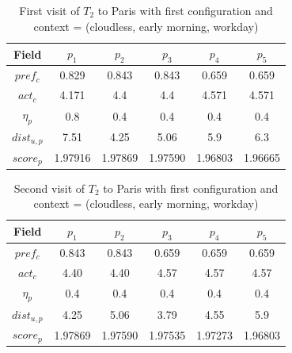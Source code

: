 \begin{table}[h!]
\vspace{-0.1cm}
\footnotesize{
    \centering
        \caption{First visit of $T_2$ to Paris with first configuration and context = (cloudless, early morning, workday)}
    \label{table:t2-3}
    \vspace{-0.3cm}
    \begin{tabular}{ |c|c|c|c|c|c| } 
        \hline
        Field   & $p_1$ & $p_2$ & $p_3$ & $p_4$ & $p_5$ \\
        \hline
        $pref_c$    &  0.829 & 0.843 & 0.843 & 0.659 & 0.659 \\
        $act_c$     & 4.171 & 4.4 & 4.4 & 4.571 & 4.571 \\
        $\eta_p$    & 0.8 & 0.4 & 0.4 & 0.4 & 0.4 \\
        $dist_{u,p}$ & 7.51 & 4.25 & 5.06 & 5.9 & 6.3 \\
        $score_p$    & 1.97916 & 1.97869 & 1.97590 & 1.96803 & 1.96665 \\
        
        \hline
    \end{tabular}
    }
    \vspace{-0.1cm}
\end{table}

\begin{table}[h!]
\vspace{-0.1cm}
\footnotesize{
    \centering
        \caption{Second visit of $T_2$ to Paris with first configuration and context = (cloudless,  early morning, workday)}
    \label{table:t2-4}
    \vspace{-0.3cm}
    \begin{tabular}{ |c|c|c|c|c|c| } 
        \hline
        Field   & $p_1$ & $p_2$ & $p_3$ & $p_4$ & $p_5$ \\
        \hline
        $pref_c$    &  0.843 & 0.843 & 0.659 & 0.659 & 0.659 \\
        $act_c$     & 4.40 & 4.40 & 4.57 & 4.57 & 4.57  \\
        $\eta_p$    & 0.4 & 0.4 & 0.4 & 0.4 & 0.4 \\
        $dist_{u,p}$ & 4.25 & 5.06 & 3.79 & 4.55 & 5.9 \\
        $score_p$    & 1.97869 & 1.97590 & 1.97535 & 1.97273 & 1.96803 \\
        
        \hline
    \end{tabular}
    }
    \vspace{-0.1cm}
\end{table}


